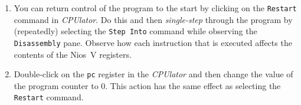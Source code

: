 \documentclass[epsfig,10pt,fullpage]{article}
\begin{document}
\begin{enumerate}
~\\
~\\
The address of the label {\it result} is \texttt{0x00000034}, which can be seen
near the bottom of Figure~\ref{fig:end}. Also, you may notice that the
\texttt{Disassembly} pane attempts to figure out the machine code at this location,
assuming that it represents a processor instruction; it does not, and so the resulting
instruction displayed (\texttt{?}) is not meaningful. 

Use the {\it CPUlator's} \texttt{Memory} pane, as illustrated in Figure~\ref{fig:memory},
to verify that the resulting value 8 is stored in the correct location.

\begin{figure}[H]
	\begin{center}
    \setlength{\fboxsep}{0pt}
	\end{center}
	\caption{The \texttt{Memory} pane.}
\label{fig:memory}
\end{figure} 

\item You can return control of the program to the start by clicking on the \texttt{Restart}
command in {\it CPUlator}.
Do this and then {\it single-step} through the program by (repeatedly) selecting the
\texttt{Step Into} command while observing the \texttt{Disassembly} pane.  
Observe how each instruction that is executed affects 
the contents of the Nios~V registers.

\item Double-click on the \texttt{pc} register in the {\it CPUlator} and then change the
value of the program counter to 0.  This action has the same effect as
selecting the \texttt{Restart} command. 


\end{enumerate}
\end{document}
